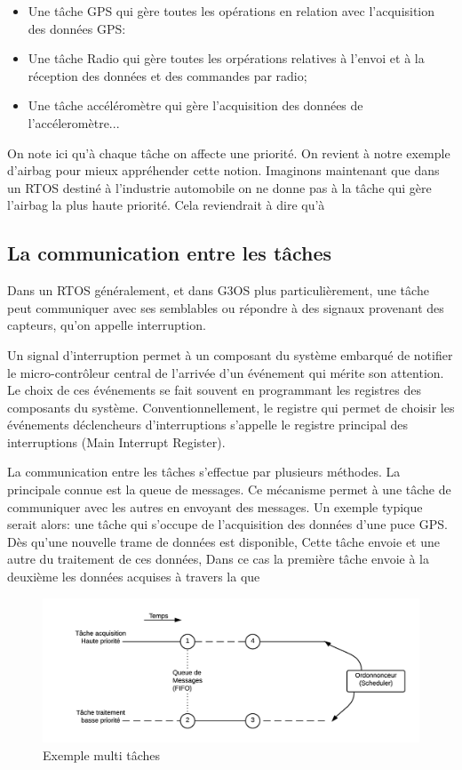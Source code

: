 \documentclass{themeensg}
\begin{document}
\begin{itemize}
\item Une tâche GPS qui gère toutes les opérations en relation avec l'acquisition des données GPS:
\item Une tâche Radio qui gère toutes les orpérations relatives à l'envoi et  à la réception des données et des commandes par radio;
\item Une tâche accéléromètre qui gère l'acquisition des données de l'accéleromètre...
\end{itemize}

On note ici qu'à chaque tâche on affecte une priorité. On revient à notre exemple d'airbag pour mieux appréhender cette notion. Imaginons maintenant que dans un RTOS destiné à l'industrie automobile on ne donne pas à la tâche qui gère l'airbag la plus haute priorité. Cela reviendrait à dire qu'à 

\subsection{La communication entre les tâches}

Dans un RTOS généralement, et dans G3OS plus particulièrement, une tâche peut communiquer avec ses semblables ou répondre à des signaux provenant des capteurs, qu'on appelle interruption.

Un signal d'interruption permet à un composant du système embarqué de notifier le micro-contrôleur central de l'arrivée d'un événement qui mérite son attention. Le choix de ces événements se fait souvent en programmant les registres des composants du système. Conventionnellement, le registre qui permet de choisir les événements déclencheurs d'interruptions s'appelle le registre principal des interruptions (Main Interrupt Register).

La communication entre les tâches s'effectue par plusieurs méthodes. La principale connue est la queue de messages. Ce mécanisme permet à une tâche de communiquer avec les autres en envoyant des messages. Un exemple typique serait alors: une tâche qui s'occupe de l'acquisition des données d'une puce GPS. Dès qu'une nouvelle trame de données est disponible, Cette tâche envoie  et une autre du traitement de ces données, Dans ce cas la première tâche envoie à la deuxième les données acquises à travers la que

\begin{figure}[h!]
\centering
\includegraphics[scale=1]{images/fig2.png}
\caption{Exemple multi tâches}
\label{fig:multitask_ex}
\end{figure}
\end{document}
